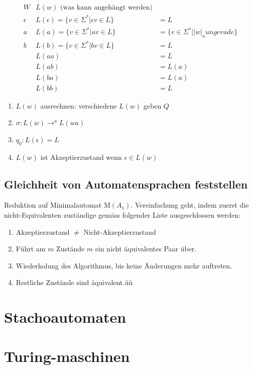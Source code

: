 \begin{align*}
W & L(w) \text{ (was kann angehängt werden)}\\
\epsilon & L(\epsilon) = \{v \in \Sigma^\ast | \epsilon v \in L \} &= L \\
a & L(a) = \{v \in \Sigma^\ast | a v \in L \} &= \{ v \in \Sigma^\ast | |w|_a ungerade \}\\
b & L(b) = \{v \in \Sigma^\ast | b v \in L \} &= L\\
  & L(aa) &= L \\
  & L(ab) &= L(a) \\
  & L(ba) &= L(a) \\
  & L(bb) &= L
\end{align*}

\begin{enumerate}
	\item $L(w)$ ausrechnen: verschiedene $L(w)$ geben $Q$ 
	\item $\sigma: L(w) \rightarrow^a L(wa)$
	\item $q_0: L(\epsilon) = L$
	\item $L(w)$ ist Akzeptierzustand wenn $\epsilon \in L(w)$
\end{enumerate}

\subsection{Gleichheit von Automatensprachen feststellen}
	Reduktion auf Minimalautomat M$(A_1)$. Vereinfachung geht, indem zuerst die nicht-Equivalenten zuständige gemäss folgender Liste ausgeschlossen werden:

\begin{enumerate}
	\item Akzeptierzustand $\neq$ Nicht-Akzeptierzustand 
	\item Führt am $m$ Zustände $m$ ein nicht äquivalentes Paar über.
	\item Wiederholung des Algorithmus, bis keine Änderungen mehr auftreten.
	\item Restliche Zustände sind äquivalent.üü
\end{enumerate}

\section{Stachoautomaten}

\section{Turing-maschinen}

